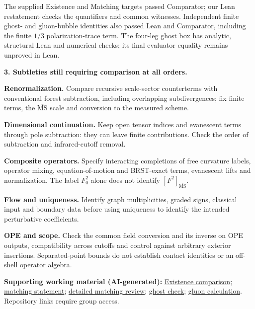 \documentclass[11pt]{article}
\newcommand{\reviewdoc}[2]{\href{https://github.com/yang-mills-group/submissions/blob/main/reviews/openai-20261104/#1}{#2}}
\begin{document}
The supplied Existence and Matching targets passed Comparator; our Lean
restatement checks the quantifiers and common witnesses. Independent finite
ghost- and gluon-bubble identities also passed Lean and Comparator, including
the finite $1/3$ polarization-trace term. The four-leg ghost box has analytic,
structural Lean and numerical checks; its final evaluator equality remains
unproved in Lean.

\textbf{3. Subtleties still requiring comparison at all orders.}
\begin{list}{\textbullet}{\setlength{\leftmargin}{12pt}\setlength{\itemsep}{2pt}\setlength{\parsep}{0pt}\setlength{\topsep}{2pt}}
\item \textbf{Renormalization.} Compare recursive scale-sector counterterms with
conventional forest subtraction, including overlapping subdivergences; fix
finite terms, the $\overline{\mathrm{MS}}$ scale and conversion to the measured scheme.
\item \textbf{Dimensional continuation.} Keep open tensor indices and evanescent terms
through pole subtraction: they can leave finite contributions. Check the order
of subtraction and infrared-cutoff removal.
\item \textbf{Composite operators.} Specify interacting completions of free
curvature labels, operator mixing, equation-of-motion and BRST-exact terms,
evanescent lifts and normalization. The label $F_0^2$ alone does not identify
$[F^2]_{\overline{\mathrm{MS}}}$.
\item \textbf{Flow and uniqueness.} Identify graph multiplicities, graded signs,
classical input and boundary data before using uniqueness to identify the
intended perturbative coefficients.
\item \textbf{OPE and scope.} Check the common field conversion and its inverse on
OPE outputs, compatibility across cutoffs and control against arbitrary exterior
insertions. Separated-point bounds do not establish contact identities or an
off-shell operator algebra.
\end{list}


{\small\textbf{Supporting working material (AI-generated):}
\reviewdoc{docs/existence/october-november-existence-comparison.pdf}{Existence comparison};
\reviewdoc{docs/matching/all-orders-statement-review.md}{matching statement};
\reviewdoc{docs/matching/november-matching-assessment-draft.pdf}{detailed matching review};
\reviewdoc{docs/matching/ghost-finite-check.md}{ghost check};
\reviewdoc{docs/matching/gluon-bubble-finite-identity.pdf}{gluon calculation}.
Repository links require group access.}
\end{document}
